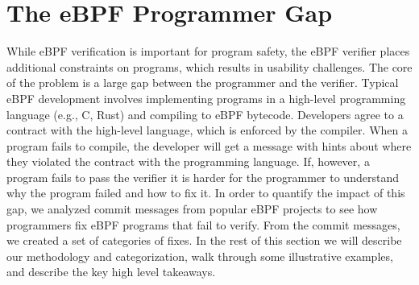 \section{The eBPF Programmer Gap}
\label{sec:motivation}

While eBPF verification is important for program safety, the eBPF verifier
    places additional constraints on programs, which results in usability challenges.
The core of the problem is a large gap between the programmer and the
    verifier.
Typical eBPF development involves implementing programs in a high-level
    programming language (e.g., C, Rust) and compiling to eBPF bytecode.
Developers agree to a contract with the high-level language, which is 
    enforced by the compiler.
When a program fails to compile, the developer will get a message with 
    hints about where they violated
    the contract with the programming language.
If, however, a program fails to pass the verifier it is harder for the programmer
    to understand why the program failed and how to fix it.
In order to quantify the impact of this gap,
    we analyzed commit messages from popular eBPF projects to see how programmers fix
    eBPF programs that fail to verify.
From the commit messages, we created a set of categories of fixes.
In the rest of this section we will describe our methodology and categorization, walk through some illustrative examples, and describe the key high level takeaways.




%

